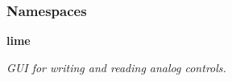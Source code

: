 \subsubsection*{Namespaces}
\begin{DoxyCompactItemize}
\item 
 {\bf lime}
\begin{DoxyCompactList}\small\item\em G\+UI for writing and reading analog controls. \end{DoxyCompactList}\end{DoxyCompactItemize}
